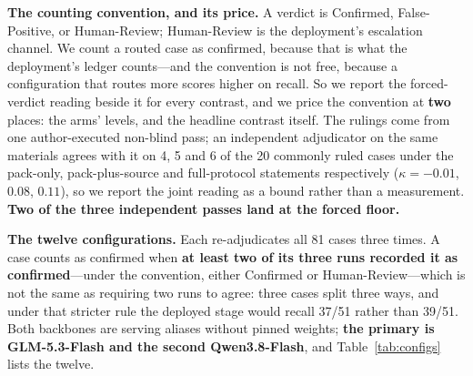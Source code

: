 \documentclass[acmsmall,screen,review,anonymous]{acmart}
\begin{document}
\textbf{The counting convention, and its price.} A verdict is Confirmed, False-Positive, or
Human-Review; Human-Review is the deployment's escalation channel. We count a routed case as
confirmed, because that is what the deployment's ledger counts---and the convention is not free,
because a configuration that routes more scores higher on recall. So we report the forced-verdict
reading beside it for every contrast, and we price the convention at \textbf{two} places: the arms'
levels, and the headline contrast itself. The rulings come from one author-executed non-blind pass;
an independent adjudicator on the same materials agrees with it on 4, 5 and 6 of the 20 commonly
ruled cases under the pack-only, pack-plus-source and full-protocol statements respectively
($\kappa = -0.01$, $0.08$, $0.11$), so we report the joint reading as a bound rather than a
measurement. \textbf{Two of the three independent passes land at the forced floor.}

\textbf{The twelve configurations.} Each re-adjudicates all 81 cases three times. A case counts as
confirmed when \textbf{at least two of its three runs recorded it as confirmed}---under the
convention, either Confirmed or Human-Review---which is not the same as requiring two runs to agree:
three cases split three ways, and under that stricter rule the deployed stage would recall 37/51
rather than 39/51. Both backbones are serving aliases without pinned weights; \textbf{the primary is
GLM-5.3-Flash and the second Qwen3.8-Flash}, and Table~\ref{tab:configs} lists the twelve.
\end{document}
